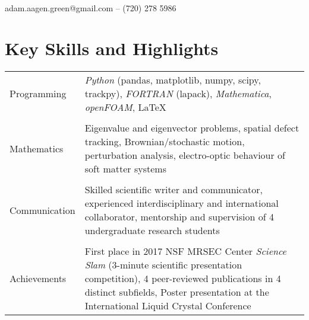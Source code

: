 \documentclass[11.5pt, a4paper]{article}
\begin{document}
 
\hspace*{-\parindent}
\begin{minipage}{0.75\textwidth}
    \begin{flushleft}
        \\
        adam.aagen.green@gmail.com -- (720) 278 5986\\
    \end{flushleft}
\end{minipage}

                                  

\section*{Key Skills and Highlights}          
\vspace{-.1in}
\noindent \begin{tabular}{@{}l p{}}\\
        Programming& \textit{Python} (pandas, matplotlib, numpy,
        scipy, trackpy), \textit{FORTRAN} (lapack), \textit{Mathematica},
        \textit{openFOAM}, \LaTeX{} \\ \\
            Mathematics & Eigenvalue and eigenvector problems, spatial defect
            tracking, Brownian/stochastic motion, perturbation
            analysis, electro-optic behaviour of soft matter systems\\\\
            Communication & Skilled scientific writer and communicator, experienced
    interdisciplinary and international collaborator, mentorship and supervision
    of 4 undergraduate research students\\\\
            Achievements & First place in 2017 NSF MRSEC Center \textit{Science Slam}
    (3-minute scientific presentation competition), 4 peer-reviewed publications
    in 4 distinct subfields, Poster presentation at the International Liquid Crystal
    Conference
\end{tabular}
\end{document}
